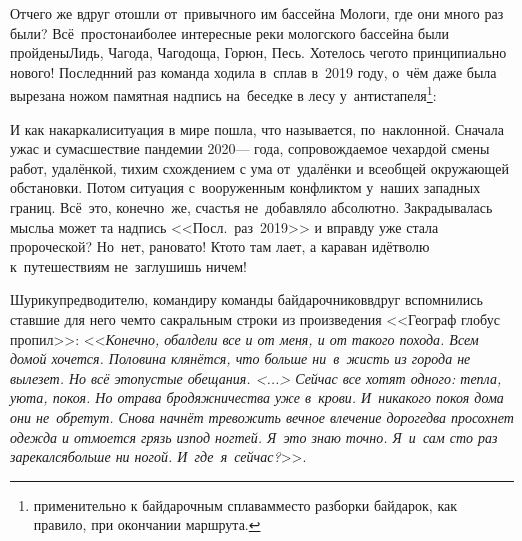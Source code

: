 {{\renewcommand*{\thefootnote}{\fnsymbol{footnote}}
\setcounter{footnote}{0}
Отчего же вдруг отошли от~привычного им бассейна Мологи, где они много раз были? Всё~просто\mdash наиболее интересные реки мологского бассейна были пройдены\mdash Лидь, Чагода, Чагодоща, Горюн, Песь. Хотелось чего\sdash то принципиально нового! Последнний раз команда ходила в~сплав в~2019 году, о~чём даже была вырезана ножом памятная надпись на~беседке в лесу у~антистапеля\footnote{применительно к байдарочным сплавам\mdash место разборки байдарок, как правило, при окончании маршрута.}: %

{\centering\LARGE{}}

\newpage
И как накаркали\mdash ситуация в мире пошла, что называется, по~наклонной. Сначала ужас и сумасшествие пандемии 2020\thinspace\nobreakdash--- года, сопровождаемое чехардой смены работ, удалёнкой, тихим схождением с ума от~удалёнки и всеобщей окружающей обстановки. Потом ситуация с~вооруженным конфликтом у~наших западных границ. Всё~это, конечно~же, счастья не~добавляло абсолютно. Закрадывалась мысль\mdash а может та надпись <<Посл.~раз~2019>> и вправду уже стала пророческой? Но~нет, рановато! Кто\sdash то там лает, а караван идёт\mdash волю к~путешествиям не~заглушишь ничем!

Шурику\mdash предводителю, командиру команды байдарочников\mdash вдруг вспомнились ставшие для него чем\sdash то сакральным строки из произведения <<Географ глобус пропил>>: <<\textit{Конечно, обалдели все и от меня, и от такого похода. Всем домой хочется. Половина клянётся, что больше ни~в~жисть из города не вылезет. Но всё это\mdash пустые обещания. <...> Сейчас все хотят одного: тепла, уюта, покоя. Но отрава бродяжничества уже в~крови. И~никакого покоя дома они не~обретут. Снова начнёт тревожить вечное влечение дорог\mdash едва просохнет одежда и отмоется грязь из\sdash под ногтей. Я~это знаю точно. Я~и~сам сто раз зарекался\mdash больше ни ногой. И~где~я~сейчас?}>>\cite{ГеографГлобусПропил}.

}}
